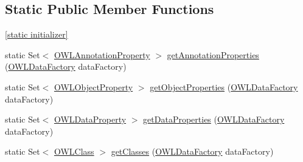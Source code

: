 \subsection*{Static Public Member Functions}
\begin{DoxyCompactItemize}
\item 
\hyperlink{enumorg_1_1semanticweb_1_1owlapi_1_1vocab_1_1_s_k_o_s_vocabulary_a7fe7b6061ebb448dd9a070f89f2bd284}{\mbox{[}static initializer\mbox{]}}
\item 
static Set$<$ \hyperlink{interfaceorg_1_1semanticweb_1_1owlapi_1_1model_1_1_o_w_l_annotation_property}{O\-W\-L\-Annotation\-Property} $>$ \hyperlink{enumorg_1_1semanticweb_1_1owlapi_1_1vocab_1_1_s_k_o_s_vocabulary_a209a02a8a8a353efe8931512a8e98f51}{get\-Annotation\-Properties} (\hyperlink{interfaceorg_1_1semanticweb_1_1owlapi_1_1model_1_1_o_w_l_data_factory}{O\-W\-L\-Data\-Factory} data\-Factory)
\item 
static Set$<$ \hyperlink{interfaceorg_1_1semanticweb_1_1owlapi_1_1model_1_1_o_w_l_object_property}{O\-W\-L\-Object\-Property} $>$ \hyperlink{enumorg_1_1semanticweb_1_1owlapi_1_1vocab_1_1_s_k_o_s_vocabulary_a6d9876423e0a0b5c9559dd1aecc12de9}{get\-Object\-Properties} (\hyperlink{interfaceorg_1_1semanticweb_1_1owlapi_1_1model_1_1_o_w_l_data_factory}{O\-W\-L\-Data\-Factory} data\-Factory)
\item 
static Set$<$ \hyperlink{interfaceorg_1_1semanticweb_1_1owlapi_1_1model_1_1_o_w_l_data_property}{O\-W\-L\-Data\-Property} $>$ \hyperlink{enumorg_1_1semanticweb_1_1owlapi_1_1vocab_1_1_s_k_o_s_vocabulary_a8ea2fa335bab56b4e5acbbd8e4c860a0}{get\-Data\-Properties} (\hyperlink{interfaceorg_1_1semanticweb_1_1owlapi_1_1model_1_1_o_w_l_data_factory}{O\-W\-L\-Data\-Factory} data\-Factory)
\item 
static Set$<$ \hyperlink{interfaceorg_1_1semanticweb_1_1owlapi_1_1model_1_1_o_w_l_class}{O\-W\-L\-Class} $>$ \hyperlink{enumorg_1_1semanticweb_1_1owlapi_1_1vocab_1_1_s_k_o_s_vocabulary_acaa8befc232e21e312dd013b0dd2a6c1}{get\-Classes} (\hyperlink{interfaceorg_1_1semanticweb_1_1owlapi_1_1model_1_1_o_w_l_data_factory}{O\-W\-L\-Data\-Factory} data\-Factory)
\end{DoxyCompactItemize}
